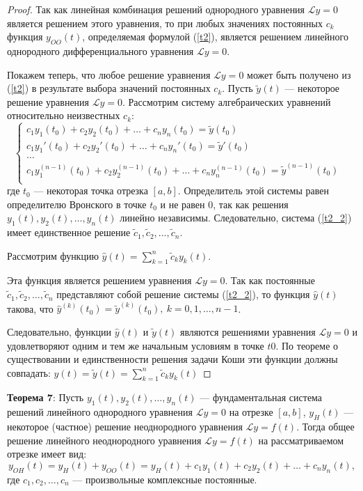 \begin{proof}
Так как линейная комбинация решений однородного уравнения $\mathcal{L}y = 0$ является решением этого уравнения, то при любых значениях постоянных $c_k$ функция $y_{OO}(t)$, определяемая формулой (\ref{t2}), является решением линейного однородного дифференциального уравнения $\mathcal{L}y = 0$.

Покажем теперь, что любое решение уравнения $\mathcal{L}y = 0$ может быть получено из (\ref{t2}) в результате выбора значений постоянных $c_k$. Пусть $\tilde{y}(t)$ --- некоторое решение уравнения $\mathcal{L}y = 0$. Рассмотрим систему алгебраических уравнений относительно неизвестных $c_k$:
\begin{equation}
    \begin{cases}
        c_1y_1(t_0) + c_2y_2(t_0) +\dots + c_ny_n(t_0) = \tilde{y}(t_0)&\\
        c_1y_1'(t_0) + c_2y_2'(t_0) +\dots + c_ny_n'(t_0) = \tilde{y}'(t_0)&\\
        \dots&\\
        c_1y_1^{(n-1)}(t_0) + c_2y_2^{(n-1)}(t_0) +\dots + c_ny_n^{(n-1)}(t_0) = \tilde{y}^{(n-1)}(t_0)&\\
    \end{cases}
    \label{t2_2}
\end{equation}
где $t_0$ --- некоторая точка отрезка $[a, b]$. Определитель этой системы равен определителю Вронского в точке $t_0$ и не равен 0, так как решения $y_1(t), y_2(t),\dots , y_n(t)$ линейно независимы. Следовательно, система (\ref{t2_2}) имеет единственное решение $\tilde{c}_1, \tilde{c}_2 ,\dots, \tilde{c}_n$.

Рассмотрим функцию $\hat{y}(t) = \displaystyle\sum_{k=1}^{n}\tilde{c}_ky_k(t).$

Эта функция является решением уравнения $\mathcal{L}y = 0$. Так как постоянные $\tilde{c}_1, \tilde{c}_2 ,\dots, \tilde{c}_n$ представляют собой решение системы (\ref{t2_2}), то функция $\hat{y}(t)$ такова, что $\hat{y}^{(k)}(t_0)=\tilde{y}^{(k)}(t_0),~k=0,1,\dots ,n-1$.

Следовательно, функции $\hat{y}(t)$ и $\tilde{y}(t)$ являются решениями уравнения $\mathcal{L}y = 0$ и удовлетворяют одним и тем же начальным условиям в точке $t0$. По теореме о существовании и единственности решения задачи Коши эти функции должны совпадать: $\hat{y}(t)=\tilde{y}(t)=\displaystyle\sum_{k=1}^{n}\tilde{c}_ky_k(t)$
\end{proof}

\textbf{Теорема 7}: Пусть $y_1(t), y_2(t),\dots, y_n(t)$ --- фундаментальная система решений линейного однородного уравнения $\mathcal{L}y = 0$ на отрезке $[a, b]$, $y_H(t)$ --- некоторое (частное) решение неоднородного уравнения $\mathcal{L}y = f(t)$. Тогда общее решение линейного неоднородного уравнения $\mathcal{L}y = f(t)$ на рассматриваемом отрезке имеет вид:
\begin{equation}
    y_{OH}(t) = y_{H}(t) + y_{OO}(t) = y_H(t) + c_1y_1(t) + c_2y_2(t) + \dots  + c_ny_n(t),
    \label{t3}
\end{equation}
где $c_1,c_2,\dots,c_n$ --- произвольные комплексные постоянные.

